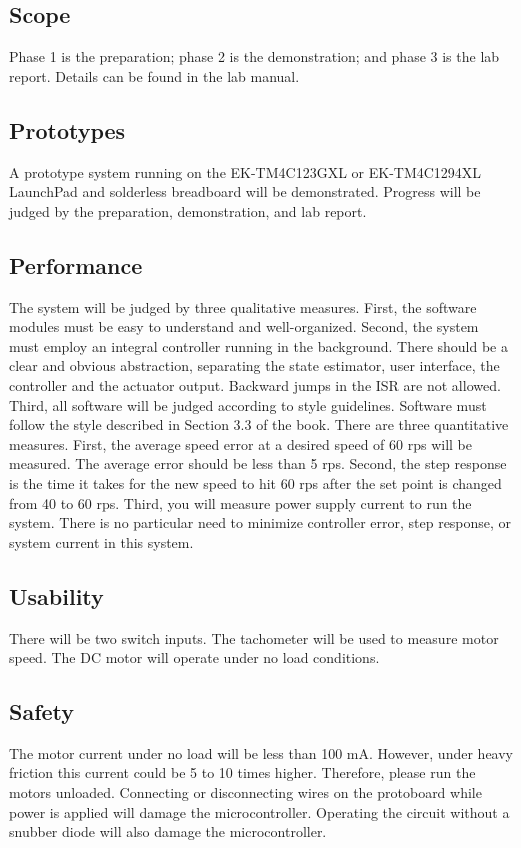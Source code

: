 \documentclass{article}
\begin{document}
	\subsection{Scope}
		Phase 1 is the preparation; phase 2 is the demonstration; and phase 3 is the lab report. Details can be found in the lab manual.
	\subsection{Prototypes}
		A prototype system running on the EK-TM4C123GXL or EK-TM4C1294XL LaunchPad and solderless breadboard will be demonstrated. Progress will be judged by the preparation, demonstration, and lab report.
	\subsection{Performance}
		The system will be judged by three qualitative measures. First, the software modules must be easy to understand and well-organized. Second, the system must employ an integral controller running in the background. There should be a clear and obvious abstraction, separating the state estimator, user interface, the controller and the actuator output. Backward jumps in the ISR are not allowed. Third, all software will be judged according to style guidelines. Software must follow the style described in Section 3.3 of the book. There are three quantitative measures. First, the average speed error at a desired speed of 60 rps will be measured. The average error should be less than 5 rps. Second, the step response is the time it takes for the new speed to hit 60 rps after the set point is changed from 40 to 60 rps. Third, you will measure power supply current to run the system. There is no particular need to minimize controller error, step response, or system current in this system.
	\subsection{Usability}
		There will be two switch inputs. The tachometer will be used to measure motor speed. The DC motor will operate under no load conditions.
	\subsection{Safety}
		The motor current under no load will be less than 100 mA. However, under heavy friction this current could be 5 to 10 times higher. Therefore, please run the motors unloaded. Connecting or disconnecting wires on the protoboard while power is applied will damage the microcontroller. Operating the circuit without a snubber diode will also damage the microcontroller. 
\end{document}
